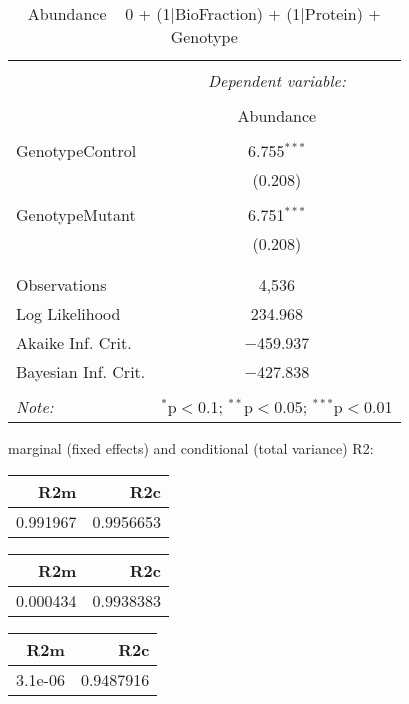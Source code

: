\documentclass[11pt]{report}
\begin{document}
\begin{table}[!htbp] \centering 
  \caption{Abundance ~ 0 + (1|BioFraction) + (1|Protein) + Genotype} 
  \label{} 
\begin{tabular}{@{\extracolsep{5pt}}lc} 
\\[-1.8ex]\hline 
\hline \\[-1.8ex] 
 & \multicolumn{1}{c}{\textit{Dependent variable:}} \\ 
\cline{2-2} 
\\[-1.8ex] & Abundance \\ 
\hline \\[-1.8ex] 
 GenotypeControl & 6.755$^{***}$ \\ 
  & (0.208) \\ 
  & \\ 
 GenotypeMutant & 6.751$^{***}$ \\ 
  & (0.208) \\ 
  & \\ 
\hline \\[-1.8ex] 
Observations & 4,536 \\ 
Log Likelihood & 234.968 \\ 
Akaike Inf. Crit. & $-$459.937 \\ 
Bayesian Inf. Crit. & $-$427.838 \\ 
\hline 
\hline \\[-1.8ex] 
\textit{Note:}  & \multicolumn{1}{r}{$^{*}$p$<$0.1; $^{**}$p$<$0.05; $^{***}$p$<$0.01} \\ 
\end{tabular} 
\end{table} 
marginal (fixed effects) and conditional (total variance) R2:

\begin{tabular}{r|r}
\hline
R2m & R2c\\
\hline
0.991967 & 0.9956653\\
\hline
\end{tabular}

\begin{tabular}{r|r}
\hline
R2m & R2c\\
\hline
0.000434 & 0.9938383\\
\hline
\end{tabular}

\begin{tabular}{r|r}
\hline
R2m & R2c\\
\hline
3.1e-06 & 0.9487916\\
\hline
\end{tabular}
\end{document}
